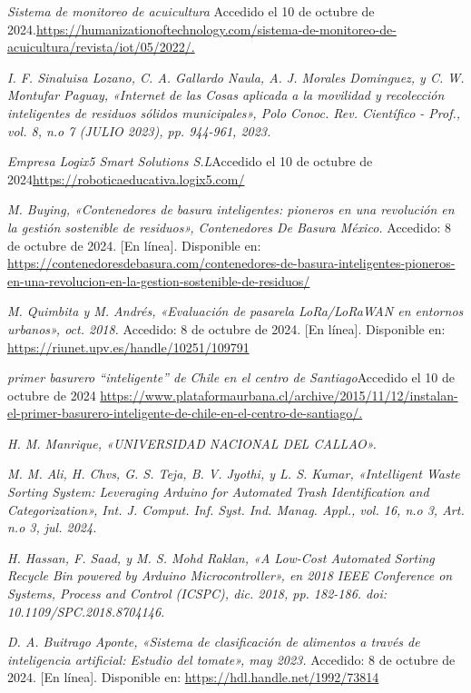 \begin{thebibliography}{99}
    \textit{Sistema de monitoreo de acuicultura} Accedido el 10 de octubre de 2024.\url{https://humanizationoftechnology.com/sistema-de-monitoreo-de-acuicultura/revista/iot/05/2022/.}
    
    \textit{I. F. Sinaluisa Lozano, C. A. Gallardo Naula, A. J. Morales Dominguez, y C. W. Montufar Paguay, «Internet de las Cosas aplicada a la movilidad y recolección inteligentes de residuos sólidos municipales», Polo Conoc. Rev. Científico - Prof., vol. 8, n.o 7 (JULIO 2023), pp. 944-961, 2023.}

    \textit{Empresa Logix5 Smart Solutions S.L}Accedido el 10 de octubre de 2024\url{https://roboticaeducativa.logix5.com/}
    
    \textit{M. Buying, «Contenedores de basura inteligentes: pioneros en una revolución en la gestión sostenible de residuos», Contenedores De Basura México.} Accedido: 8 de octubre de 2024. [En línea]. Disponible en: \url{https://contenedoresdebasura.com/contenedores-de-basura-inteligentes-pioneros-en-una-revolucion-en-la-gestion-sostenible-de-residuos/}
    
    \textit{M. Quimbita y M. Andrés, «Evaluación de pasarela LoRa/LoRaWAN en entornos urbanos», oct. 2018.} Accedido: 8 de octubre de 2024. [En línea]. Disponible en: \url{https://riunet.upv.es/handle/10251/109791}

    \textit{primer basurero “inteligente” de Chile en el centro de Santiago}Accedido el 10 de octubre de 2024 \url{https://www.plataformaurbana.cl/archive/2015/11/12/instalan-el-primer-basurero-inteligente-de-chile-en-el-centro-de-santiago/.}
    
    \textit{H. M. Manrique, «UNIVERSIDAD NACIONAL DEL CALLAO».}
    
    \textit{M. M. Ali, H. Chvs, G. S. Teja, B. V. Jyothi, y L. S. Kumar, «Intelligent Waste Sorting System: Leveraging Arduino for Automated Trash Identification and Categorization», Int. J. Comput. Inf. Syst. Ind. Manag. Appl., vol. 16, n.o 3, Art. n.o 3, jul. 2024.}
    
    \textit{H. Hassan, F. Saad, y M. S. Mohd Raklan, «A Low-Cost Automated Sorting Recycle Bin powered by Arduino Microcontroller», en 2018 IEEE Conference on Systems, Process and Control (ICSPC), dic. 2018, pp. 182-186. doi: 10.1109/SPC.2018.8704146.}
    
    \textit{D. A. Buitrago Aponte, «Sistema de clasificación de alimentos a través de inteligencia artificial: Estudio del tomate», may 2023.} Accedido: 8 de octubre de 2024. [En línea]. Disponible en: \url{https://hdl.handle.net/1992/73814}
    

\end{thebibliography}
